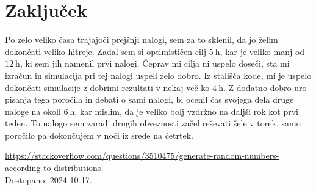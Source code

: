 \documentclass[12pt]{article}
\begin{document}
\section*{Zaključek}
Po zelo veliko časa trajajoči prejšnji nalogi, sem za to sklenil, da jo želim dokončati veliko hitreje. Zadal sem si optimističen cilj $\SI{5}{\hour}$, kar je veliko manj od $\SI{12}{\hour}$, ki sem jih namenil prvi nalogi. Čeprav mi cilja ni uspelo doseči, sta mi izračun in simulacija pri tej nalogi uspeli zelo dobro. Iz stališča kode, mi je uspelo dokončati simulacije z dobrimi rezultati v nekaj več ko $\SI{4}{\hour}$. Z dodatno dobro uro pisanja tega poročila in debati o sami nalogi, bi ocenil čas svojega dela druge naloge na okoli $\SI{6}{\hour}$, kar mislim, da je veliko bolj vzdržno na daljši rok kot prvi teden. To nalogo sem zaradi drugih obveznosti začel reševati šele v torek, samo poročilo pa dokončujem v noči iz srede na četrtek.

\begin{thebibliography}{9}

    \url{https://stackoverflow.com/questions/3510475/generate-random-numbers-according-to-distributions}. \\
    Dostopano: 2024-10-17.

\end{thebibliography}
\end{document}
